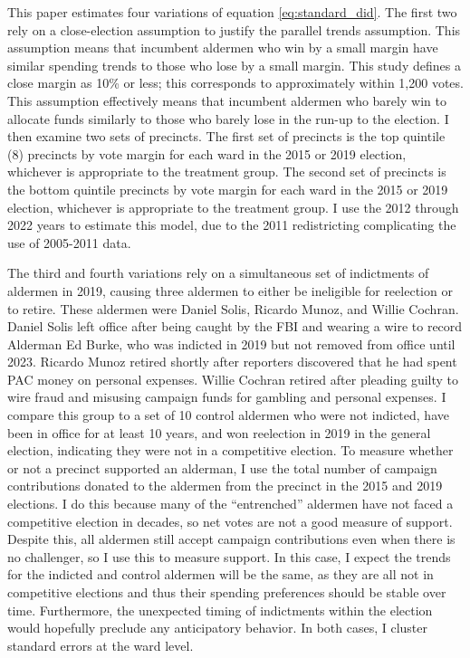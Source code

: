 This paper estimates four variations of equation \ref{eq:standard_did}. 
The first two rely on a close-election assumption to justify the parallel trends assumption. 
This assumption means that incumbent aldermen who win by a small margin have similar spending trends to those who lose by a small margin.
This study defines a close margin as 10\% or less; this corresponds to approximately within 1,200 votes.
This assumption effectively means that incumbent aldermen who barely win to allocate funds similarly to those who barely lose in the run-up to the election.
I then examine two sets of precincts. 
The first set of precincts is the top quintile (8) precincts by vote margin for each ward in the 2015 or 2019 election, whichever is appropriate to the treatment group. 
The second set of precincts is the bottom quintile precincts by vote margin for each ward in the 2015 or 2019 election, whichever is appropriate to the treatment group.
I use the 2012 through 2022 years to estimate this model, due to the 2011 redistricting complicating the use of 2005-2011 data. 

The third and fourth variations rely on a simultaneous set of indictments of aldermen in 2019, causing three aldermen to either be ineligible for reelection or to retire. 
These aldermen were Daniel Solis, Ricardo Munoz, and Willie Cochran. 
Daniel Solis left office after being caught by the FBI and wearing a wire to record Alderman Ed Burke, who was indicted in 2019 but not removed from office until 2023.
Ricardo Munoz retired shortly after reporters discovered that he had spent PAC money on personal expenses.
Willie Cochran retired after pleading guilty to wire fraud and misusing campaign funds for gambling and personal expenses.
I compare this group to a set of 10 control aldermen who were not indicted, have been in office for at least 10 years, and won reelection in 2019 in the general election, indicating they were not in a competitive election. 
To measure whether or not a precinct supported an alderman, I use the total number of campaign contributions donated to the aldermen from the precinct in the 2015 and 2019 elections.
I do this because many of the ``entrenched'' aldermen have not faced a competitive election in decades, so net votes are not a good measure of support.
Despite this, all aldermen still accept campaign contributions even when there is no challenger, so I use this to measure support.
In this case, I expect the trends for the indicted and control aldermen will be the same, as they are all not in competitive elections and thus their spending preferences should be stable over time.
Furthermore, the unexpected timing of indictments within the election would hopefully preclude any anticipatory behavior.
In both cases, I cluster standard errors at the ward level.
